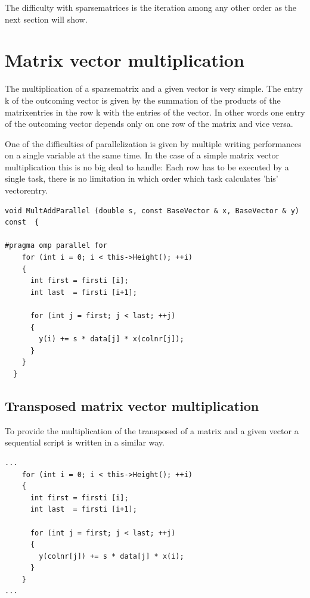 \documentclass[a4paper,11pt]{scrartcl}
\begin{document}
The difficulty with sparsematrices is the iteration among any other order as
the next section will show.

\section{Matrix vector multiplication}

The multiplication of a sparsematrix and a given vector is very simple.
The entry k of the outcoming vector is given by the summation of the products
of the matrixentries in the row k with the entries of the vector. In other
words one entry of the outcoming vector depends only on one row of the matrix
and vice versa.

One of the difficulties of parallelization is given by multiple writing
performances on a single variable at the same time. In the case of a simple
 matrix vector multiplication this is no big deal to handle: Each row has to be
executed by a single task, there is no limitation in which order which task
 calculates 'his' vectorentry.

\begin{lstlisting}
void MultAddParallel (double s, const BaseVector & x, BaseVector & y) const  {

#pragma omp parallel for
    for (int i = 0; i < this->Height(); ++i)
    {
      int first = firsti [i];
      int last  = firsti [i+1];

      for (int j = first; j < last; ++j)
      {
        y(i) += s * data[j] * x(colnr[j]);
      }
    }
  }

\end{lstlisting}

\subsection{Transposed matrix vector multiplication}

To provide the multiplication of the transposed of a matrix and a given vector
 a sequential script is written in a similar way.

\begin{lstlisting}
...
    for (int i = 0; i < this->Height(); ++i)
    {
      int first = firsti [i];
      int last  = firsti [i+1];

      for (int j = first; j < last; ++j)
      {
        y(colnr[j]) += s * data[j] * x(i);
      }
    }
...
\end{lstlisting}
\end{document}
